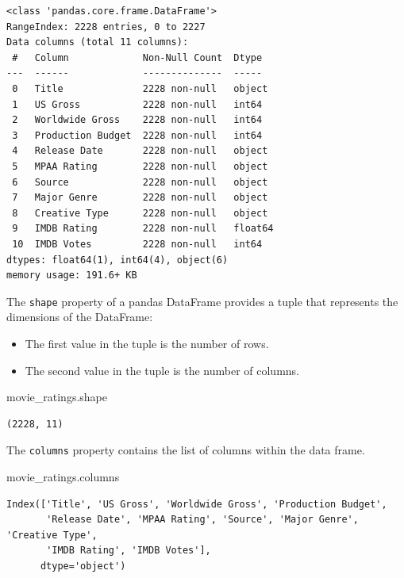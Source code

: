 \documentclass[
  letterpaper,
  DIV=11,
  numbers=noendperiod]{scrreprt}
\newenvironment{Shaded}{\begin{snugshade}}{\end{snugshade}}
\newcommand{\NormalTok}[1]{\textcolor[rgb]{0.00,0.23,0.31}{#1}}
\providecommand{\tightlist}{%
  \setlength{\itemsep}{0pt}\setlength{\parskip}{0pt}}\usepackage{longtable,booktabs,array}
\begin{document}
\begin{verbatim}
<class 'pandas.core.frame.DataFrame'>
RangeIndex: 2228 entries, 0 to 2227
Data columns (total 11 columns):
 #   Column             Non-Null Count  Dtype  
---  ------             --------------  -----  
 0   Title              2228 non-null   object 
 1   US Gross           2228 non-null   int64  
 2   Worldwide Gross    2228 non-null   int64  
 3   Production Budget  2228 non-null   int64  
 4   Release Date       2228 non-null   object 
 5   MPAA Rating        2228 non-null   object 
 6   Source             2228 non-null   object 
 7   Major Genre        2228 non-null   object 
 8   Creative Type      2228 non-null   object 
 9   IMDB Rating        2228 non-null   float64
 10  IMDB Votes         2228 non-null   int64  
dtypes: float64(1), int64(4), object(6)
memory usage: 191.6+ KB
\end{verbatim}

The \texttt{shape} property of a pandas DataFrame provides a tuple that
represents the dimensions of the DataFrame:

\begin{itemize}
\tightlist
\item
  The first value in the tuple is the number of rows.
\item
  The second value in the tuple is the number of columns.
\end{itemize}

\begin{Shaded}
\begin{Highlighting}[]
\NormalTok{movie\_ratings.shape}
\end{Highlighting}
\end{Shaded}

\begin{verbatim}
(2228, 11)
\end{verbatim}

The \texttt{columns} property contains the list of columns within the
data frame.

\begin{Shaded}
\begin{Highlighting}[]
\NormalTok{movie\_ratings.columns}
\end{Highlighting}
\end{Shaded}

\begin{verbatim}
Index(['Title', 'US Gross', 'Worldwide Gross', 'Production Budget',
       'Release Date', 'MPAA Rating', 'Source', 'Major Genre', 'Creative Type',
       'IMDB Rating', 'IMDB Votes'],
      dtype='object')
\end{verbatim}
\end{document}
